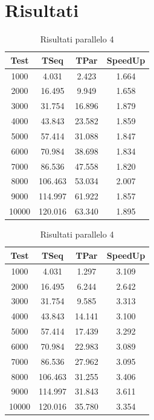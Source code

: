 \documentclass[11pt]{article}
\begin{document}
    \section{Risultati}\label{sec:risultati}
    \begin{table}[!ht]
        \centering
        \begin{subtable}{0.45\textwidth}
            \centering
            \begin{tabular}{|c|c|c|c|}
                \hline
                Test & TSeq & TPar & SpeedUp \\ \hline
                1000 & 4.031 & 2.423 & 1.664 \\ \hline
                2000 & 16.495 & 9.949 & 1.658 \\ \hline
                3000 & 31.754 & 16.896 & 1.879 \\ \hline
                4000 & 43.843 & 23.582 & 1.859 \\ \hline
                5000 & 57.414 & 31.088 & 1.847 \\ \hline
                6000 & 70.984 & 38.698 & 1.834 \\ \hline
                7000 & 86.536 & 47.558 & 1.820 \\ \hline
                8000 & 106.463 & 53.034 & 2.007 \\ \hline
                9000 & 114.997 & 61.922 & 1.857 \\ \hline
                10000 & 120.016 & 63.340 & 1.895 \\ \hline
            \end{tabular}
            \caption{Risultati parallelo 2}\label{tab:table-parallel2}
        \end{subtable}
        \hfill
        \begin{subtable}{0.45\textwidth}
            \centering
            \begin{tabular}{|c|c|c|c|}
                \hline
                Test & TSeq & TPar & SpeedUp \\ \hline
                1000 & 4.031 & 1.297 & 3.109 \\ \hline
                2000 & 16.495 & 6.244 & 2.642 \\ \hline
                3000 & 31.754 & 9.585 & 3.313 \\ \hline
                4000 & 43.843 & 14.141 & 3.100 \\ \hline
                5000 & 57.414 & 17.439 & 3.292 \\ \hline
                6000 & 70.984 & 22.983 & 3.089 \\ \hline
                7000 & 86.536 & 27.962 & 3.095 \\ \hline
                8000 & 106.463 & 31.255 & 3.406 \\ \hline
                9000 & 114.997 & 31.843 & 3.611 \\ \hline
                10000 & 120.016 & 35.780 & 3.354 \\ \hline
            \end{tabular}
            \caption{Risultati parallelo 4}\label{tab:table-parallel4}
        \end{subtable}



\end{table}
\end{document}
